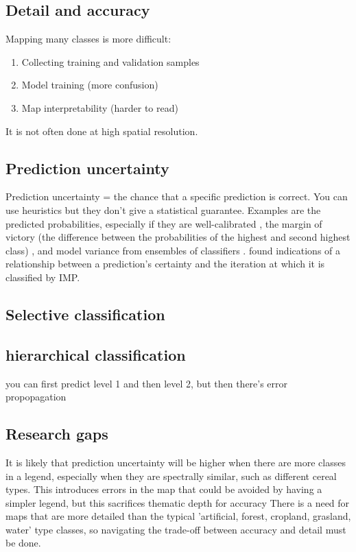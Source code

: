     \subsection{Detail and accuracy}
        
        Mapping many classes is more difficult:
        \begin{enumerate}
        \item Collecting training and validation samples
        \item Model training (more confusion)
        \item Map interpretability (harder to read)
        \end{enumerate}
        It is not often done at high spatial resolution.

    \subsection{Prediction uncertainty}
        Prediction uncertainty = the chance that a specific prediction is correct.
        You can use heuristics but they don't give a statistical guarantee. Examples are the predicted probabilities, especially if they are well-calibrated \citep{niculescu2005predicting}, the margin of victory (the difference between the probabilities of the highest and second highest class) \citep{calderon-loor2021high}, and model variance from ensembles of classifiers \citep{witjes2022spatiotemporal}. \citet{witjes2024iterative} found indications of a relationship between a prediction's certainty and the iteration at which it is classified by IMP.

    \subsection{Selective classification}

    \subsection{hierarchical classification}
        you can first predict level 1 and then level 2, but then there's error propopagation

    \subsection{Research gaps}
        It is likely that prediction uncertainty will be higher when there are more classes in a legend, especially when they are spectrally similar, such as different cereal types. This introduces errors in the map that could be avoided by having a simpler legend, but this sacrifices thematic depth for accuracy There is a need for maps that are more detailed than the typical 'artificial, forest, cropland, grasland, water' type classes, so navigating the trade-off between accuracy and detail must be done.


